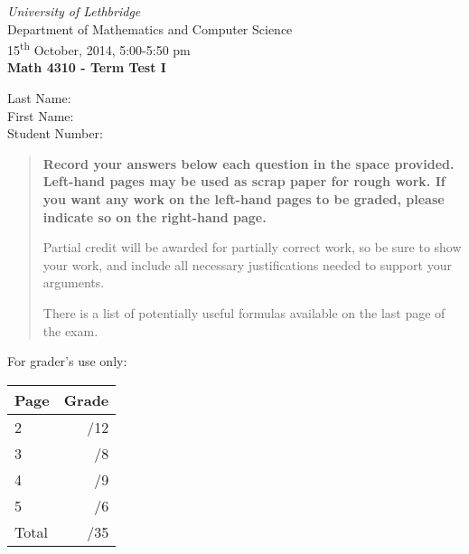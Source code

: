 \documentclass[12pt]{article}
\newcommand{\skipline}{\vspace{12pt}}
\begin{document}
\author{Instructor: Sean Fitzpatrick}
\thispagestyle{plain}
\begin{center}
\emph{University of Lethbridge}\\
Department of Mathematics and Computer Science\\
15\textsuperscript{th} October, 2014, 5:00-5:50 pm\\
{\bf Math 4310 - Term Test I}\\
\end{center}
\skipline \skipline \skipline \noindent \skipline
Last Name:\underline{\hspace{50pt}{\bf SOLUTIONS}\hspace{50pt}}\\
\skipline
First Name:\underline{\hspace{50pt}{\bf THE}\hspace{100pt}}\\
\skipline
Student Number:\underline{\hspace{322pt}}\\


\vspace{0.5in}


\begin{quote}
 {\bf Record your answers below each question in the space provided.    Left-hand pages may be used as scrap paper for rough work.  If you want any work on the left-hand pages to be graded, please indicate so on the right-hand page.
 
 \bigskip
 
Partial credit will be awarded for partially correct work, so be sure to show your work, and include all necessary justifications needed to support your arguments. 

There is a list of potentially useful formulas available on the last page of the exam.}
\end{quote}


\vspace{0.5in}

For grader's use only:

\begin{table}[hbt]
\begin{center}
\begin{tabular}{|l|r|} \hline
Page&Grade\\
\hline \hline
\cline{1-2} 2 & \enspace\enspace\enspace\enspace\enspace\enspace/12\\
\cline{1-2} 3 & \enspace\enspace\enspace\enspace\enspace\enspace/8\\
\cline{1-2} 4 & \enspace\enspace\enspace\enspace\enspace\enspace/9\\
\cline{1-2} 5 & \enspace\enspace\enspace\enspace\enspace\enspace/6\\
\cline{1-2} Total & \enspace\enspace\enspace\enspace\enspace\enspace/35\\
\hline
\end{tabular}

\skipline

\skipline

\skipline


\end{center}
\end{table}
\newpage
\end{document}
